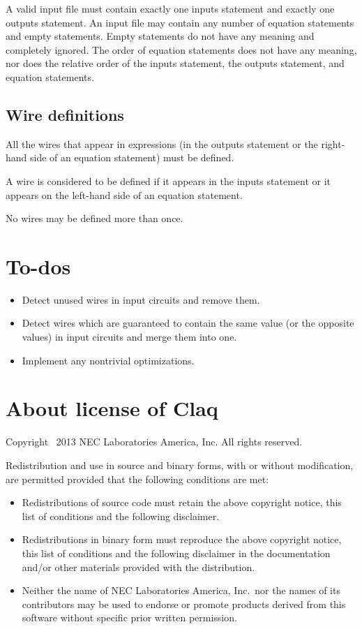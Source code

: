 \documentclass[letterpaper,11pt]{article}
\begin{document}
A valid input file must contain exactly one inputs statement
and exactly one outputs statement.
An input file may contain any number of equation statements and empty statements.
Empty statements do not have any meaning and completely ignored.
The order of equation statements does not have any meaning,
nor does the relative order of the inputs statement, the outputs statement,
and equation statements.

\subsection{Wire definitions}

All the wires that appear in expressions
(in the outputs statement or the right-hand side of an equation statement)
must be defined.

A wire is considered to be defined if it appears in the inputs statement
or it appears on the left-hand side of an equation statement.

No wires may be defined more than once.

\section{To-dos}

\begin{itemize}
\item
  Detect unused wires in input circuits and remove them.
\item
  Detect wires which are guaranteed to contain the same value
  (or the opposite values) in input circuits
  and merge them into one.
\item
  Implement any nontrivial optimizations.
\end{itemize}

\section*{About license of Claq}

Copyright \textcopyright\ 2013 NEC Laboratories America, Inc.
All rights reserved.

Redistribution and use in source and binary forms, with or without
modification, are permitted provided that the following conditions are
met:
\begin{itemize}
\item
  Redistributions of source code must retain the above copyright
  notice, this list of conditions and the following disclaimer.
\item
  Redistributions in binary form must reproduce the above
  copyright notice, this list of conditions and the following
  disclaimer in the documentation and/or other materials provided
  with the distribution.
\item
  Neither the name of NEC Laboratories America, Inc.\ nor the names
  of its contributors may be used to endorse or promote products
  derived from this software without specific prior written
  permission.
\end{itemize}
\end{document}
